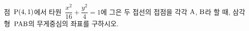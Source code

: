 점~$\mathrm{P}(4{,}\mkern3mu\mathopen{}1)$에서 타원~$\dfrac{x^2}{16}+\dfrac{y^2}{4}=1$에 그은 두 접선의 접점을 각각 $\mathrm{A}$, $\mathrm{B}$라 할 때, 삼각형~$\mathrm{PAB}$의 무게중심의 좌표를 구하시오.
